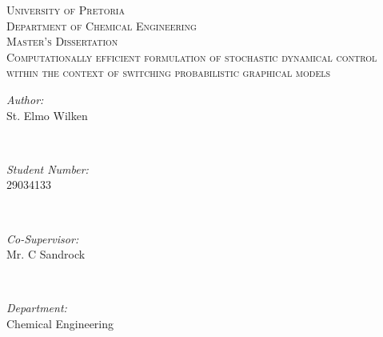 \begin{titlepage}

\center %
 

\textsc{\LARGE University of Pretoria}\\[1.5cm] %
\textsc{\Large Department of Chemical Engineering}\\[0.5cm] %
\textsc{\large Master's Dissertation}\\[2.5cm] %



\huge \textsc{Computationally efficient formulation of stochastic dynamical control within the context of switching probabilistic graphical models} \\[2.5cm]
 

\begin{minipage}{0.4\textwidth}
\begin{flushleft} \large
\emph{Author:}\\
St. Elmo Wilken %
\end{flushleft}
\end{minipage}
~
\begin{minipage}{0.4\textwidth}
\begin{flushright} \large
\emph{Student Number:} \\
29034133 
\end{flushright}
\end{minipage}\\[2cm]

\begin{minipage}{0.4\textwidth}
\begin{flushleft} \large
\emph{Co-Supervisor:}\\
Mr. C Sandrock %
\end{flushleft}
\end{minipage}
~
\begin{minipage}{0.4\textwidth}
\begin{flushright} \large
\emph{Department:} \\
Chemical Engineering
\end{flushright}
\end{minipage}\\[2cm]


\end{titlepage}
